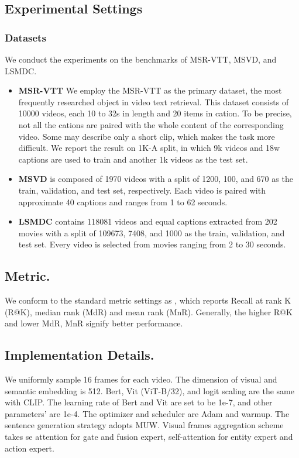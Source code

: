 \documentclass[letterpaper]{article} \usepackage{aaai22}  \usepackage{times}  \usepackage{helvet}  \usepackage{courier}  \usepackage[hyphens]{url}  \usepackage{graphicx} \urlstyle{rm} \def\UrlFont{\rm}  \usepackage{natbib}  \usepackage{caption}
\begin{document}
\subsection{Experimental Settings}
\subsubsection{Datasets}
We conduct the experiments on the benchmarks of MSR-VTT\cite{xu2016msr}, MSVD\cite{chen2011collecting}, and LSMDC\cite{rohrbach2015long}.

\begin{itemize}
    \item \textbf{MSR-VTT}
We employ the MSR-VTT\cite{xu2016msr} as the primary dataset, the most frequently researched object in video text retrieval. This dataset consists of 10000 videos, each 10 to 32s in length and 20 items in cation. To be precise, not all the cations are paired with the whole content of the corresponding video. Some may describe only a short clip, which makes the task more difficult. We report the result on 1K-A split\cite{gabeur2020multi}, in which 9k videos and 18w captions are used to train and another 1k videos as the test set. 
    \item \textbf{MSVD}\cite{chen2011collecting} is composed of 1970 videos with a split of 1200, 100, and 670 as the train, validation, and test set, respectively. Each video is paired with approximate 40 captions and ranges from 1 to 62 seconds.
    \item \textbf{LSMDC}\cite{rohrbach2015long,rohrbach2017movie} contains 118081 videos and equal captions extracted from 202 movies with a split of 109673, 7408, and 1000 as the train, validation, and test set. Every video is selected from movies ranging from 2 to 30 seconds.
\end{itemize}


\subsection{Metric.}
We conform to the standard metric settings as \cite{luo2021clip4clip}, which reports Recall at rank K (R@K), median rank (MdR) and mean rank (MnR). Generally, the higher R@K and lower MdR, MnR signify better performance.

\subsection{Implementation Details.}
We uniformly sample 16 frames for each video. The dimension of visual and semantic embedding is 512. Bert, Vit (ViT-B/32), and logit scaling  are the same with CLIP. The learning rate of Bert and Vit are set to be 1e-7, and other parameters' are 1e-4. The optimizer and scheduler are Adam\cite{kingma2014adam} and warmup\cite{goyal2017accurate}. The sentence generation strategy adopts MUW. Visual frames aggregation scheme takes se attention for gate and fusion expert, self-attention for entity expert and action expert.
\end{document}
